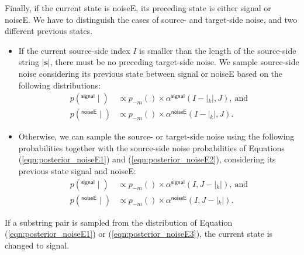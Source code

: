 \documentclass[english]{jnlp_1.4}
\def\pair#1#2{}
\def\subpair#1#2{}
\newcommand{\svec}[1]{}
\begin{document}
Finally, if the current state is {\sf noiseE}, its preceding state is either {\sf signal} or {\sf noiseE}.
We have to distinguish the cases of source- and target-side noise, and two different previous states.

\begin{itemize}
\item If the current source-side index {$I$} is smaller than the length of the source-side string {$|\boldsymbol{s}|$}, there must be no preceding target-side noise. We sample source-side noise considering its previous state between {\sf signal} or {\sf noiseE} based on the following distributions:
\begin{align}
 p (\subpair{\svec{\sigma}_{k}}{\mathit{noise}}^\mathsf{signal} \mid \pair{\boldsymbol{s}}{\boldsymbol{t}}) 
	& \propto p_{-m} (\subpair{\svec{\sigma}_{k}}{\mathit{noise}}) \times \alpha^\mathsf{signal} (I - |\svec{\sigma}_{k}|, J),\ \text{and}
	\label{eqn:posterior_noiseE1}\\
 p (\subpair{\svec{\sigma}_{k}}{\mathit{noise}}^\mathsf{noiseE} \mid \pair{\boldsymbol{s}}{\boldsymbol{t}}) 
	& \propto p_{-m} (\subpair{\svec{\sigma}_{k}}{\mathit{noise}}) \times \alpha^\mathsf{noiseE} (I - |\svec{\sigma}_{k}|, J).
	\label{eqn:posterior_noiseE2}
\end{align}

\item Otherwise, we can sample the source- or target-side noise using the following probabilities together with the source-side noise probabilities of Equations ({\ref{eqn:posterior_noiseE1}}) and ({\ref{eqn:posterior_noiseE2}}), considering its previous state {\sf signal} and {\sf noiseE}:
\pagebreak
\begin{align}
 p (\subpair{\mathit{noise}}{\svec{\tau}_{k}}^\mathsf{signal} \mid \pair{\boldsymbol{s}}{\boldsymbol{t}}) 
	& \propto p_{-m} (\subpair{\mathit{noise}}{\svec{\tau}_{k}}) \times \alpha^\mathsf{signal} (I, J - |\svec{\tau}_{k}|),\ \text{and}
	\label{eqn:posterior_noiseE3}\\
 p (\subpair{\mathit{noise}}{\svec{\tau}_{k}}^\mathsf{noiseE} \mid \pair{\boldsymbol{s}}{\boldsymbol{t}}) 
	& \propto p_{-m} (\subpair{\mathit{noise}}{\svec{\tau}_{k}}) \times \alpha^\mathsf{noiseE} (I, J - |\svec{\tau}_{k}|).
	\label{eqn:posterior_noiseE4}
\end{align}
\end{itemize}
If a substring pair is sampled from the distribution of Equation ({\ref{eqn:posterior_noiseE1}}) or ({\ref{eqn:posterior_noiseE3}}), the current state is changed to {\sf signal}.
\end{document}
